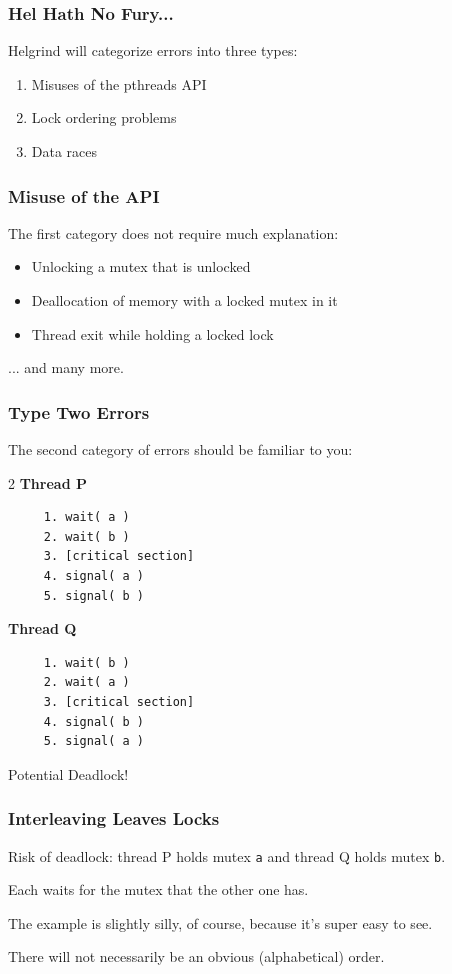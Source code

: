 \begin{frame}
	\frametitle{Hel Hath No Fury...}

	Helgrind will categorize errors into three types:

	\begin{enumerate}
		\item Misuses of the pthreads API
		\item Lock ordering problems
		\item Data races
	\end{enumerate}


\end{frame}

\begin{frame}
	\frametitle{Misuse of the API}

	The first category does not require much explanation:


	\begin{itemize}
		\item Unlocking a mutex that is unlocked
		\item Deallocation of memory with a locked mutex in it
		\item Thread exit while holding a locked lock
	\end{itemize}
	... and many more.


\end{frame}

\begin{frame}[fragile]
	\frametitle{Type Two Errors}

	The second category of errors should be familiar to you:

	\begin{multicols}{2}
		\textbf{Thread P}
		\begin{verbatim}
	 1. wait( a ) 
	 2. wait( b )
	 3. [critical section]
	 4. signal( a )
	 5. signal( b )
  \end{verbatim}
		\columnbreak
		\textbf{Thread Q}
		\begin{verbatim}
	 1. wait( b ) 
	 2. wait( a )
	 3. [critical section]
	 4. signal( b )
	 5. signal( a )
  \end{verbatim}
	\end{multicols}
	\vspace{-2em}

	Potential Deadlock!

\end{frame}

\begin{frame}
	\frametitle{Interleaving Leaves Locks}

	Risk of deadlock: thread P holds mutex \texttt{a} and thread Q holds mutex \texttt{b}.

	Each waits for the mutex that the other one has.

	The example is slightly silly, of course, because it's super easy to see.

	There will not necessarily be an obvious (alphabetical) order.

\end{frame}

